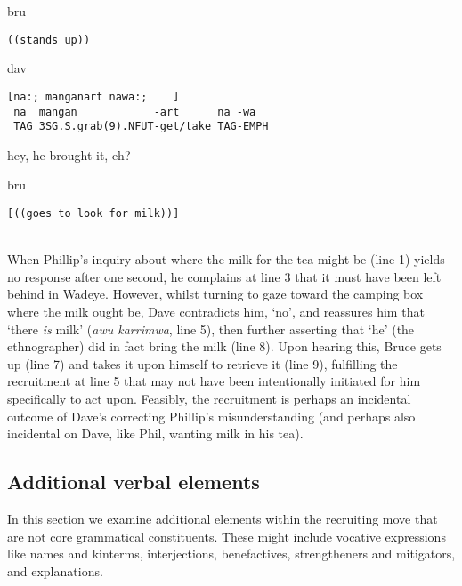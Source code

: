 \documentclass[output=paper,nonflat,colorlinks,citecolor=brown]{langsci/langscibook}
\begin{document}
%
\begin{mdframednoverticalspace}[style=secondfoc]
\begin{transbox}{7}{bru}
\begin{verbatim}
((stands up))
\end{verbatim}
\end{transbox}
\end{mdframednoverticalspace}
%
\begin{transbox}{8}{dav}
\begin{verbatim}
[na:; manganart nawa:;    ]
 na  mangan            -art      na -wa
 TAG 3SG.S.grab(9).NFUT-get/take TAG-EMPH
\end{verbatim}
\hspace{0.07cm} hey, he brought it, eh?
\end{transbox}
%
\begin{transbox}{9}{bru}
\begin{verbatim}
[((goes to look for milk))]
\end{verbatim}
\end{transbox}\\

When Phillip’s inquiry about where the milk for the tea might be (line 1) yields no response after one second, he complains  at line 3 that it must have been left behind in Wadeye. However, whilst turning to gaze toward the camping box where the milk ought be, Dave contradicts him, ‘no’, and reassures him that ‘there \textit{is} milk’ (\textit{awu karrimwa}, line 5), then further asserting that ‘he’ (the ethnographer) did in fact bring the milk (line 8). Upon hearing this, Bruce gets up (line 7) and takes it upon himself to retrieve it (line 9), fulfilling the recruitment at line 5 that may not have been intentionally initiated for him specifically to act upon. Feasibly, the recruitment is perhaps an incidental outcome of Dave’s correcting Phillip’s misunderstanding (and perhaps also incidental on Dave, like Phil, wanting milk in his tea).

\subsection{Additional verbal elements}

In this section we examine additional elements within the recruiting move that are not core grammatical constituents. These might include vocative expressions like names and kinterms, interjections, benefactives, strengtheners and mitigators, and explanations.
\end{document}
